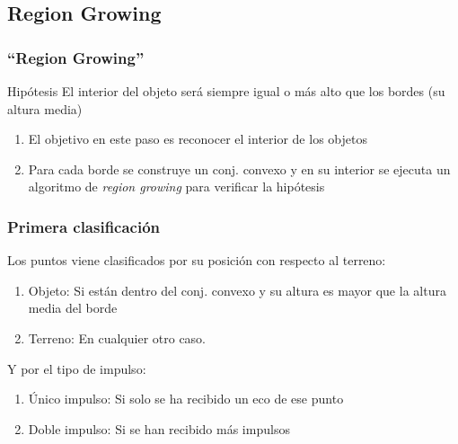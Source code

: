 \subsection{Region Growing}
\begin{frame}
  \frametitle{``Region Growing''}
\begin{beamerboxesrounded}[shadow=true]{Hipótesis}
El interior del objeto será siempre igual o más alto que los bordes (su altura media)
\end{beamerboxesrounded}

\begin{enumerate}
 \item El objetivo en este paso es reconocer el \alert{interior} de los objetos
 \item Para cada borde se construye un \alert{conj. convexo} y en su interior se ejecuta un algoritmo de \alert{\emph{region growing}} para verificar la hipótesis
\end{enumerate}
\end{frame}
\begin{frame}
  \frametitle{Primera clasificación}
Los puntos viene clasificados por su posición con respecto al terreno: \pause
\begin{enumerate}
 \item \alert{Objeto}: Si están dentro del conj. convexo y su altura es mayor que la altura media del borde
 \item \alert{Terreno}: En cualquier otro caso.
\end{enumerate}

\pause
Y por el tipo de impulso:
\begin{enumerate}
 \item \alert{\'Unico impulso}: Si solo se ha recibido un eco de ese punto
 \item \alert{Doble impulso}: Si se han recibido más impulsos
\end{enumerate}
\end{frame}
